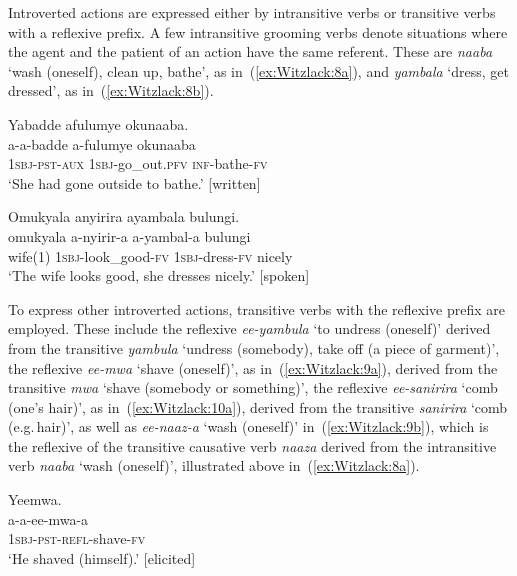 \documentclass[output=paper,colorlinks,citecolor=brown,
]{langscibook}
\begin{document}
Introverted actions are expressed either by intransitive verbs or transitive verbs with a reflexive prefix. 
A few intransitive grooming verbs denote situations where the agent and the patient of an action have the same referent. 
These are \emph{naaba} ‘wash (oneself), clean up, bathe’, as in~(\ref{ex:Witzlack:8a}), and \emph{yambala} ‘dress, get dressed’, as in~(\ref{ex:Witzlack:8b}).

\ea\label{ex:Witzlack:8}
\ea  \label{ex:Witzlack:8a}
	\glll	Yabadde afulumye okunaaba.\\
        	a-a-badde		a-fulumye		okunaaba\\
		\textsc{1sbj}-\textsc{pst}-\textsc{aux}		\textsc{1sbj}-go\_out.\textsc{pfv}	\textsc{inf}-bathe-\textsc{fv}\\
		\glt	‘She had gone outside to bathe.’ [written] %

\ex \label{ex:Witzlack:8b}
	\glll Omukyala anyirira ayambala bulungi.\\
		omukyala a-nyirir-a		a-yambal-a	bulungi\\
		wife(1)	\textsc{1sbj}-look\_good-\textsc{fv}	\textsc{1sbj}-dress-\textsc{fv}	nicely\\
		\glt ‘The wife looks good, she dresses nicely.’ [spoken] %

\z 
\z

To express other introverted actions, transitive verbs with the reflexive prefix are employed. These include the reflexive \emph{ee-yambula} ‘to undress (oneself)’ derived from the transitive \emph{yambula} ‘undress (somebody), take off (a piece of garment)’, the reflexive \emph{ee-mwa} ‘shave (oneself)’, as in~(\ref{ex:Witzlack:9a}), derived from the transitive \emph{mwa} ‘shave (somebody or something)’, the reflexive \emph{ee-sanirira} ‘comb (one’s hair)’, as in~(\ref{ex:Witzlack:10a}), derived from the transitive \emph{sanirira} ‘comb (e.g.\,hair)’, as well as \emph{ee-naaz-a} ‘wash (oneself)’ in~(\ref{ex:Witzlack:9b}), which is the reflexive of the transitive causative verb \emph{naaza} derived from the intransitive verb \emph{naaba} ‘wash (oneself)’, illustrated above in~(\ref{ex:Witzlack:8a}).

\ea\label{ex:Witzlack:9}

\ea  \label{ex:Witzlack:9a}
	\glll	Yeemwa.\\
            a-a-ee-mwa-a\\
		\textsc{1sbj}-\textsc{pst}-\textsc{refl}-shave-\textsc{fv}\\
		\glt	‘He shaved (himself).’ [elicited]
\end{document}
